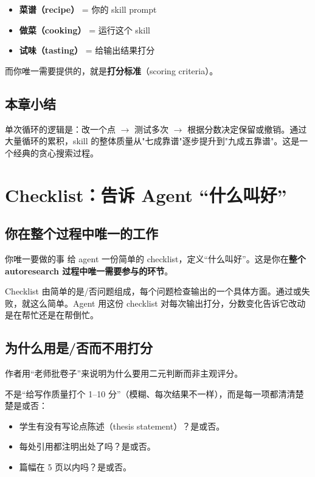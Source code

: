 \documentclass[a4paper]{article}
\begin{document}
\begin{itemize}
    \item \textbf{菜谱（recipe）} = 你的 skill prompt
    \item \textbf{做菜（cooking）} = 运行这个 skill
    \item \textbf{试味（tasting）} = 给输出结果打分
\end{itemize}

而你唯一需要提供的，就是\textbf{打分标准}（scoring criteria）。

\subsection{本章小结}

单次循环的逻辑是：改一个点 $\to$ 测试多次 $\to$ 根据分数决定保留或撤销。通过大量循环的累积，skill 的整体质量从"七成靠谱"逐步提升到"九成五靠谱"。这是一个经典的贪心搜索过程。

\section{Checklist：告诉 Agent ``什么叫好''}

\subsection{你在整个过程中唯一的工作}

\begin{importantbox}{你唯一要做的事}
给 agent 一份简单的 checklist，定义``什么叫好''。这是你在\textbf{整个 autoresearch 过程中唯一需要参与的环节}。

Checklist 由简单的是/否问题组成，每个问题检查输出的一个具体方面。通过或失败，就这么简单。Agent 用这份 checklist 对每次输出打分，分数变化告诉它改动是在帮忙还是在帮倒忙。
\end{importantbox}

\subsection{为什么用是/否而不用打分}

作者用``老师批卷子''来说明为什么要用二元判断而非主观评分。

不是``给写作质量打个 1--10 分''（模糊、每次结果不一样），而是每一项都清清楚楚是或否：

\begin{itemize}
    \item 学生有没有写论点陈述（thesis statement）？是或否。
    \item 每处引用都注明出处了吗？是或否。
    \item 篇幅在 5 页以内吗？是或否。
\end{itemize}
\end{document}
